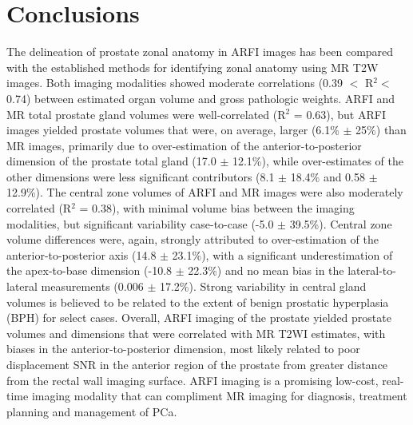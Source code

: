 \section{Conclusions}
The delineation of prostate zonal anatomy in ARFI images has been compared with
the established methods for identifying zonal anatomy using MR T2W images.
Both imaging modalities showed moderate correlations (0.39 $<$ R$^2 < $ 0.74)
between estimated organ volume and gross pathologic weights.  ARFI and MR total
prostate gland volumes were well-correlated (R$^2$ = 0.63), but ARFI images
yielded prostate volumes that were, on average, larger (6.1\% $\pm$ 25\%) than
MR images, primarily due to over-estimation of the anterior-to-posterior
dimension of the prostate total gland (17.0 $\pm$ 12.1\%), while over-estimates
of the other dimensions were less significant contributors (8.1 $\pm$ 18.4\%
and 0.58 $\pm$ 12.9\%).  The central zone volumes of ARFI and MR images were
also moderately correlated (R$^2$ = 0.38), with minimal volume bias between the
imaging modalities, but significant variability case-to-case (-5.0 $\pm$
39.5\%).  Central zone volume differences were, again, strongly attributed to
over-estimation of the anterior-to-posterior axis (14.8 $\pm$ 23.1\%), with a
significant underestimation of the apex-to-base dimension (-10.8 $\pm$ 22.3\%)
and no mean bias in the lateral-to-lateral measurements (0.006 $\pm$ 17.2\%).
Strong variability in central gland volumes is believed to be related to the
extent of benign prostatic hyperplasia (BPH) for select cases.  Overall, ARFI
imaging of the prostate yielded prostate volumes and dimensions that were
correlated with MR T2WI estimates, with biases in the anterior-to-posterior
dimension, most likely related to poor displacement SNR in the anterior region
of the prostate from greater distance from the rectal wall imaging surface.
ARFI imaging is a promising low-cost, real-time imaging modality that can
compliment MR imaging for diagnosis, treatment planning and management of PCa.
